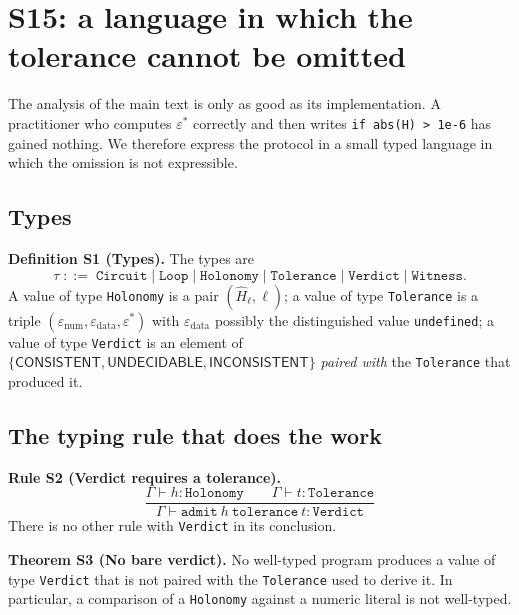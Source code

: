 \documentclass[11pt,a4paper]{article}
\theoremstyle{definition}
\theoremstyle{remark}
\newcommand{\eps}{\varepsilon}
\newcommand{\epsnum}{\eps_{\mathrm{num}}}
\newcommand{\epsdata}{\eps_{\mathrm{data}}}
\newcommand{\epsstar}{\eps^{\ast}}
\newcommand{\hol}{H}
\newcommand{\cf}[1]{\texttt{#1}}
\begin{document}

\section*{S15: a language in which the tolerance cannot be omitted}

The analysis of the main text is only as good as its
implementation. A practitioner who computes $\epsstar$ correctly and then writes
\verb|if abs(H) > 1e-6| has gained nothing. We therefore express the
protocol in a small typed language in which the omission is not
expressible.

\subsection*{Types}

\par\noindent\textbf{Definition S1 (Types).}\label{def:types} 
The types are
\[
  \tau \;::=\; \cf{Circuit} \mid \cf{Loop} \mid \cf{Holonomy}
  \mid \cf{Tolerance} \mid \cf{Verdict} \mid \cf{Witness}.
\]
A value of type \cf{Holonomy} is a pair $(\widehat{\hol}_\ell,\ell)$; a
value of type \cf{Tolerance} is a triple
$(\epsnum,\epsdata,\epsstar)$ with $\epsdata$ possibly the distinguished
value \cf{undefined}; a value of type \cf{Verdict} is an element of
$\{\textsf{CONSISTENT},\textsf{UNDECIDABLE},\textsf{INCONSISTENT}\}$
\emph{paired with} the \cf{Tolerance} that produced it.
\par

\subsection*{The typing rule that does the work}

\par\noindent\textbf{Rule S2 (Verdict requires a tolerance).}\label{rule:verdict} 
\[
  \frac{\Gamma\vdash h : \cf{Holonomy}
        \qquad \Gamma\vdash t : \cf{Tolerance}}
       {\Gamma\vdash \cf{admit}\ h\ \cf{tolerance}\ t : \cf{Verdict}}
\]
There is no other rule with \cf{Verdict} in its conclusion.
\par

\par\noindent\textbf{Theorem S3 (No bare verdict).}\label{thm:no-bare-verdict} 
No well-typed program produces a value of type \cf{Verdict} that is not
paired with the \cf{Tolerance} used to derive it. In particular, a
comparison of a \cf{Holonomy} against a numeric literal is not
well-typed.
\par
\end{document}
